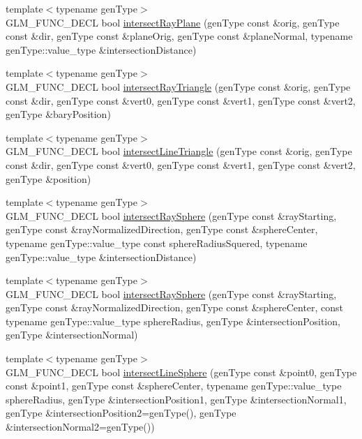\begin{CompactItemize}
\item 
{\footnotesize template$<$typename genType$>$ }\\GLM\_\-FUNC\_\-DECL bool \hyperlink{group__gtx__intersect_g1699af184f5244ebe224fd653dd0bfc0}{intersectRayPlane} (genType const \&orig, genType const \&dir, genType const \&planeOrig, genType const \&planeNormal, typename genType::value\_\-type \&intersectionDistance)
\item 
{\footnotesize template$<$typename genType$>$ }\\GLM\_\-FUNC\_\-DECL bool \hyperlink{group__gtx__intersect_gbf48f0fca6a10a8edb001b3d546de5fe}{intersectRayTriangle} (genType const \&orig, genType const \&dir, genType const \&vert0, genType const \&vert1, genType const \&vert2, genType \&baryPosition)
\item 
{\footnotesize template$<$typename genType$>$ }\\GLM\_\-FUNC\_\-DECL bool \hyperlink{group__gtx__intersect_g1aa5d241478d1493ff4d8c22b8d9e293}{intersectLineTriangle} (genType const \&orig, genType const \&dir, genType const \&vert0, genType const \&vert1, genType const \&vert2, genType \&position)
\item 
{\footnotesize template$<$typename genType$>$ }\\GLM\_\-FUNC\_\-DECL bool \hyperlink{group__gtx__intersect_g95b17f6f08015c92fc8ac3e83010492d}{intersectRaySphere} (genType const \&rayStarting, genType const \&rayNormalizedDirection, genType const \&sphereCenter, typename genType::value\_\-type const sphereRadiusSquered, typename genType::value\_\-type \&intersectionDistance)
\item 
{\footnotesize template$<$typename genType$>$ }\\GLM\_\-FUNC\_\-DECL bool \hyperlink{group__gtx__intersect_g2e6a97dd3fcdbf83c24dd3499f81014b}{intersectRaySphere} (genType const \&rayStarting, genType const \&rayNormalizedDirection, genType const \&sphereCenter, const typename genType::value\_\-type sphereRadius, genType \&intersectionPosition, genType \&intersectionNormal)
\item 
{\footnotesize template$<$typename genType$>$ }\\GLM\_\-FUNC\_\-DECL bool \hyperlink{group__gtx__intersect_g28b9b80acf2ea35780709e01b27ab60f}{intersectLineSphere} (genType const \&point0, genType const \&point1, genType const \&sphereCenter, typename genType::value\_\-type sphereRadius, genType \&intersectionPosition1, genType \&intersectionNormal1, genType \&intersectionPosition2=genType(), genType \&intersectionNormal2=genType())

\end{CompactItemize}
